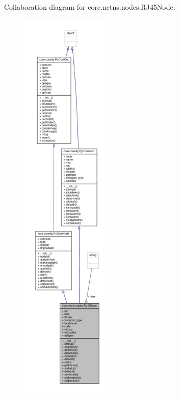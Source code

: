 Collaboration diagram for core.\+netns.\+nodes.\+R\+J45\+Node\+:
\nopagebreak
\begin{figure}[H]
\begin{center}
\leavevmode
\includegraphics[height=550pt]{classcore_1_1netns_1_1nodes_1_1_r_j45_node__coll__graph}
\end{center}
\end{figure}
